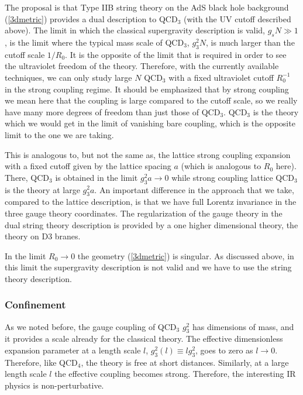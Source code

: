 The proposal is that Type IIB string theory on the AdS black hole background
(\ref{3dmetric}) provides a dual description to QCD$_3$ (with the UV
cutoff described above).
The limit in which the classical supergravity description is valid, 
$g_sN \gg 1$,
is the limit where the typical mass scale of QCD$_3$, $g_3^2 N$, is much
larger than the cutoff scale $1/R_0$.
It is the opposite of the limit that is required in order 
to see the ultraviolet freedom
of the theory.
Therefore, with the currently available techniques, we 
can only study large $N$ QCD$_3$ with a fixed ultraviolet
cutoff $R_0^{-1}$ in the strong coupling regime.
It should be emphasized that by strong coupling we mean here that the
coupling is large compared to the cutoff scale, so we really have many
more degrees of freedom than just those of QCD$_3$.
QCD$_3$ is the theory which we would get 
in the limit of vanishing bare coupling, which
is the opposite limit to the one we are taking.

This is analogous to, but not the same as, 
the lattice strong coupling expansion with a fixed 
cutoff given by the
 lattice spacing $a$ (which is analogous to $R_0$ here).
There, QCD$_3$ is
 obtained in the limit $g_3^2 a \rightarrow 0$ while strong 
coupling lattice QCD$_3$ is the theory at large $g_3^2 a$.
An important  difference in the approach that we take, 
compared to the lattice description,
is that 
we have full Lorentz 
invariance in the three gauge theory coordinates.  
The regularization of the gauge theory
in the dual string theory description
is provided by a one higher dimensional theory, the theory on D3 branes.

In the limit 
$R_0 \rightarrow 0$ the geometry (\ref{3dmetric}) is singular.
As discussed 
above, in this limit the supergravity description is not valid
and we have to use the string theory description.
 

\subsubsection{Confinement}

As we noted before,
the gauge coupling of QCD$_3$ $g_3^2$ has dimensions of mass, and 
it provides a scale
already for the classical theory.
The effective dimensionless expansion parameter at a 
length scale $l$, $g_3^2(l)\equiv
 l g_3^2$, goes to zero as $l \rightarrow 0$.
Therefore, like QCD$_4$, the theory is free at short distances.
Similarly, at a large length scale $l$ the effective coupling 
becomes strong. Therefore,
the interesting IR physics is non-perturbative.


